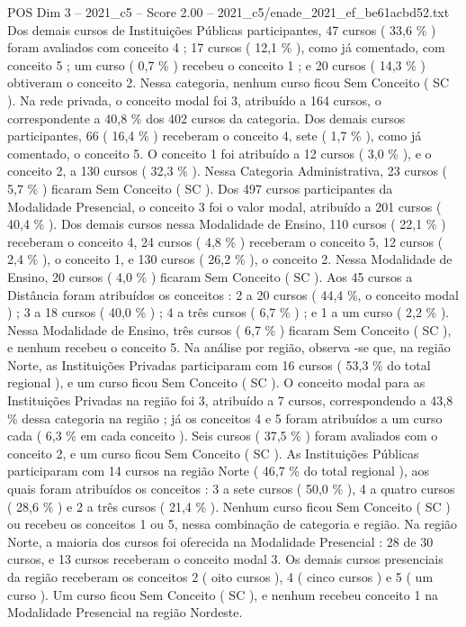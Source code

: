 \begin{textsample}{POS Dim 3 – 2021\_c5 – Score 2.00 – 2021\_c5/enade\_2021\_ef\_be61acbd52.txt}
Dos demais cursos de Instituições Públicas participantes, 47 cursos ( 33,6 \% ) foram avaliados com conceito 4 ; 17 cursos ( 12,1 \% ), como já comentado, com conceito 5 ; um curso ( 0,7 \% ) recebeu o conceito 1 ; e 20 cursos ( 14,3 \% ) obtiveram o conceito 2.
Nessa categoria, nenhum curso ficou Sem Conceito ( SC ).
Na rede privada, o conceito modal foi 3, atribuído a 164 cursos, o correspondente a 40,8 \% dos 402 cursos da categoria.
Dos demais cursos participantes, 66 ( 16,4 \% ) receberam o conceito 4, sete ( 1,7 \% ), como já comentado, o conceito 5.
O conceito 1 foi atribuído a 12 cursos ( 3,0 \% ), e o conceito 2, a 130 cursos ( 32,3 \% ).
Nessa Categoria Administrativa, 23 cursos ( 5,7 \% ) ficaram Sem Conceito ( SC ).
Dos 497 cursos participantes da Modalidade Presencial, o conceito 3 foi o valor modal, atribuído a 201 cursos ( 40,4 \% ).
Dos demais cursos nessa Modalidade de Ensino, 110 cursos ( 22,1 \% ) receberam o conceito 4, 24 cursos ( 4,8 \% ) receberam o conceito 5, 12 cursos ( 2,4 \% ), o conceito 1, e 130 cursos ( 26,2 \% ), o conceito 2.
Nessa Modalidade de Ensino, 20 cursos ( 4,0 \% ) ficaram Sem Conceito ( SC ).
Aos 45 cursos a Distância foram atribuídos os conceitos : 2 a 20 cursos ( 44,4 \%, o conceito modal ) ; 3 a 18 cursos ( 40,0 \% ) ; 4 a três cursos ( 6,7 \% ) ; e 1 a um curso ( 2,2 \% ).
Nessa Modalidade de Ensino, três cursos ( 6,7 \% ) ficaram Sem Conceito ( SC ), e nenhum recebeu o conceito 5.
Na análise por região, observa -se que, na região Norte, as Instituições Privadas participaram com 16 cursos ( 53,3 \% do total regional ), e um curso ficou Sem Conceito ( SC ).
O conceito modal para as Instituições Privadas na região foi 3, atribuído a 7 cursos, correspondendo a 43,8 \% dessa categoria na região ; já os conceitos 4 e 5 foram atribuídos a um curso cada ( 6,3 \% em cada conceito ).
Seis cursos ( 37,5 \% ) foram avaliados com o conceito 2, e um curso ficou Sem Conceito ( SC ).
As Instituições Públicas participaram com 14 cursos na região Norte ( 46,7 \% do total regional ), aos quais foram atribuídos os conceitos : 3 a sete cursos ( 50,0 \% ), 4 a quatro cursos ( 28,6 \% ) e 2 a três cursos ( 21,4 \% ).
Nenhum curso ficou Sem Conceito ( SC ) ou recebeu os conceitos 1 ou 5, nessa combinação de categoria e região.
Na região Norte, a maioria dos cursos foi oferecida na Modalidade Presencial : 28 de 30 cursos, e 13 cursos receberam o conceito modal 3.
Os demais cursos presenciais da região receberam os conceitos 2 ( oito cursos ), 4 ( cinco cursos ) e 5 ( um curso ).
Um curso ficou Sem Conceito ( SC ), e nenhum recebeu conceito 1 na Modalidade Presencial na região Nordeste.

\end{textsample}
